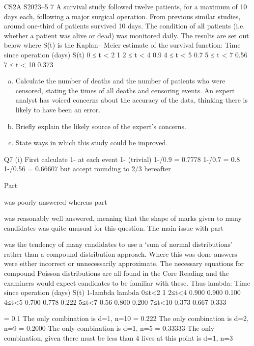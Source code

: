 \documentclass[a4paper,12pt]{article}
\begin{document}


CS2A S2023–5
7 A survival study followed twelve patients, for a maximum of 10 days each, following
a major surgical operation. From previous similar studies, around one-third of patients
survived 10 days. The condition of all patients (i.e. whether a patient was alive or
dead) was monitored daily. The results are set out below where S(t) is the Kaplan–
Meier estimate of the survival function:
Time since operation (days) S(t)
0 ≤ t < 2 1
2 ≤ t < 4 0.9
4 ≤ t < 5 0.7
5 ≤ t < 7 0.56
7 ≤ t < 10 0.373

\begin{enumerate}[(a)]
\item Calculate the number of deaths and the number of patients who were censored,
stating the times of all deaths and censoring events. 
An expert analyst has voiced concerns about the accuracy of the data, thinking there is
likely to have been an error.
\item Briefly explain the likely source of the expert’s concerns. 
\item State ways in which this study could be improved. 
\end{enumerate}


Q7
(i)
First calculate 1- \lambda at each event
1- (trivial)
1-/0.9 = 0.7778
1-/0.7 = 0.8
1-/0.56 = 0.66607 but accept rounding to 2/3 hereafter

Part \item was poorly answered whereas part \item was reasonably well answered, meaning that the shape of marks given to many candidates was quite unusual for this question.
The main issue with part \item was the tendency of many candidates to use a ‘sum of normal distributions’ rather than a compound distribution approach. Where this was done answers were either incorrect or unnecessarily approximate. The necessary equations for compound Poisson distributions are all found in the Core Reading and the examiners would expect candidates to be familiar with these.
\newline
Thus lambda:
Time since operation (days)
S(t)
1-lambda
lambda
0≤t<2
1
2≤t<4
0.900
0.900
0.100
4≤t<5
0.700
0.778
0.222
5≤t<7
0.56
0.800
0.200
7≤t<10
0.373
0.667
0.333

\lambda = 0.1
The only combination is d=1, n=10 
\lambda = 0.222
The only combination is d=2, n=9 
\lambda = 0.2000
The only combination is d=1, n=5 
\lambda = 0.33333
The only combination, given there must be less than 4 lives at this point is d=1, n=3
\end{document}
